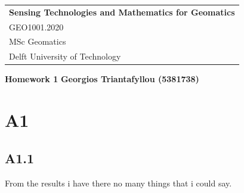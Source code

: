 \documentclass[a4paper,12pt]{article}
\begin{document}
	\thispagestyle{empty}
	\begin{tabular}{p{15.5cm}}
		{\large \bf Sensing Technologies and Mathematics for Geomatics} \\
		GEO1001.2020 \\ MSc Geomatics \\ Delft University of Technology \\
		\hline
	\end{tabular} 
\vspace*{0.3cm}
\begin{center}
	{\Large \bf Homework 1}
	\vspace{2mm}
	{\bf Georgios Triantafyllou (5381738)}
\end{center} 
\vspace{0.4cm}
\section{A1}
 \subsection{A1.1}
From the results i have there no many things that i could say.
\end{document}
